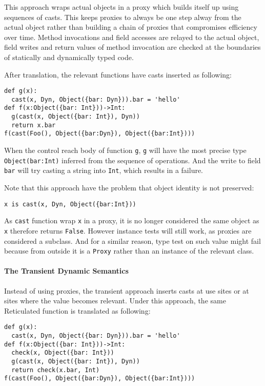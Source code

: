 This approach wraps actual objects in a proxy which builds itself up using sequences of casts.
This keeps proxies to always be one step alway from the actual object rather than building
a chain of proxies that compromises efficiency over time.
Method invocations and field accesses are relayed to the actual object,
field writes and return values of method invocation are checked at the boundaries
of statically and dynamically typed code.

After translation, the relevant functions have casts inserted as following:

\begin{verbatim}
def g(x):
  cast(x, Dyn, Object({bar: Dyn})).bar = 'hello'
def f(x:Object({bar: Int}))->Int:
  g(cast(x, Object({bar: Int}), Dyn))
  return x.bar
f(cast(Foo(), Object({bar:Dyn}), Object({bar:Int})))
\end{verbatim}

When the control reach body of function \texttt{g},
\texttt{g} will have the most precise type \texttt{Object({bar:Int})} inferred from the sequence
of operations. And the write to field \texttt{bar} will try casting a string into \texttt{Int},
which results in a failure.

Note that this approach have the problem that object identity is not preserved:

\begin{verbatim}
x is cast(x, Dyn, Object({bar:Int}))
\end{verbatim}

As \texttt{cast} function wrap \texttt{x} in a proxy, it is no longer considered the same object as \texttt{x}
therefore returns \texttt{False}. However instance tests will still work, as proxies are considered a subclass.
And for a similar reason, type test on such value might fail because from outside it is a \texttt{Proxy}
rather than an instance of the relevant class.

\paragraph{The Transient Dynamic Semantics}

Instead of using proxies, the transient approach inserts casts at use sites or at sites where
the value becomes relevant. Under this approach, the same Reticulated function is translated as following:

\begin{verbatim}
def g(x):
  cast(x, Dyn, Object({bar: Dyn})).bar = 'hello'
def f(x:Object({bar: Int}))->Int:
  check(x, Object({bar: Int}))
  g(cast(x, Object({bar: Int}), Dyn))
  return check(x.bar, Int)
f(cast(Foo(), Object({bar:Dyn}), Object({bar:Int})))
\end{verbatim}

